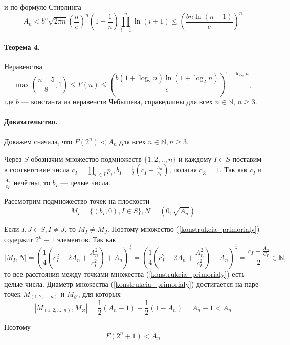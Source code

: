 \documentclass[a4paper,14pt]{article} %
\begin{document}
и по формуле Стирлинга
\begin{equation}\label{ocenka_Stirling}
A_n <
b^n \sqrt{2\pi n} \left(\frac{n}{e}\right)^n \left(1+\frac{1}{n}\right) \prod_{i=1}^{n} \ln(i+1)
\leq \left(\frac{bn\ln (n+1)}{e}\right)^n
\end{equation}


\paragraph{Теорема 4.}
Неравенства
$$
	\max\left( \frac{n-5}{8}, 1 \right) \leq F(n) \leq \left( \frac{b (1+\log_2 n )\ln (1 + \log_2 n)}{e}\right)^{1+\log_2 n},
$$
где $b$ --- константа из неравенств Чебышева, справедливы для всех $n\in\mathbb{N}$, $n \geq 3$.

\paragraph{Доказательство.}
Докажем сначала, что
$F(2^n)<A_n$ для всех $n\in\mathbb{N}, n \geq 3$.

Через $S$ обозначим множество подмножеств $\{1,2,..,n\}$ и каждому $I\in S$ поставим в соответствие числа
$c_I=\prod\limits_{c\in I}p_i, b_I=\frac{1}{2}\left(c_I-\frac{A_n}{c_I}\right)$,
полагая $c_\varnothing = 1$.
Так как $c_I$ и $\frac{A_n}{c_I}$ нечётны, то $b_I$ --- целые числа.

Рассмотрим подмножество точек на плоскости
\begin{equation}\label{konstrukcia_primorialy}
M_I=\{(b_I,0), I\in S\}, N=(0, \sqrt{A_n})
\end{equation}

Если $I,J \in S, I \neq J$, то $M_I \neq M_J$.
Поэтому множество (\ref{konstrukcia_primorialy}) содержит $2^n+1$ элементов.
Так как
\begin{equation*}
	|M_I,N|=\left(\frac{1}{4}\left( c_I^2 - 2 A_n + \frac{A_n^2}{c_I^2} \right)+A_n\right)^\frac{1}{2}=
	\left(\frac{1}{4}\left( c_I^2 - 2 A_n + \frac{A_n^2}{c_I^2} \right)+A_n\right)^\frac{1}{2}=
	\frac{c_I+\frac{A_n}{C_I}}{2} \in \mathbb{N},
\end{equation*}
то все расстояния между точками множества (\ref{konstrukcia_primorialy}) есть целые числа.
Диаметр множества (\ref{konstrukcia_primorialy}) достигается на паре точек $M_{(1,2,...,n)}$ и $M_{\varnothing}$, для которых
$$
|M_{(1,2,...,n)},M_{\varnothing}|=\frac{1}{2}(A_n-1)-\frac{1}{2}(1-A_n) = A_n-1 < A_n
$$

Поэтому 
$$
F(2^n+1) < A_n
$$
\end{document}
